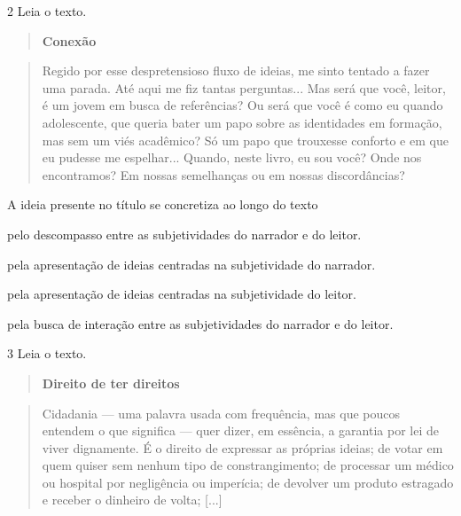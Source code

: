 \num{2} Leia o texto.

\begin{quote}
\centering\textbf{Conexão}
\end{quote}


\begin{quote}
Regido por esse despretensioso fluxo de ideias, me sinto tentado a fazer
uma parada. Até aqui me fiz tantas perguntas... Mas será que você,
leitor, é um jovem em busca de referências? Ou será que você é como eu
quando adolescente, que queria bater um papo sobre as identidades em
formação, mas sem um viés acadêmico? Só um papo que trouxesse conforto e
em que eu pudesse me espelhar... Quando, neste livro, eu sou você? Onde
nos encontramos? Em nossas semelhanças ou em nossas discordâncias?
\end{quote}



A ideia presente no título se concretiza ao longo do texto

\begin{escolha}
\item pelo descompasso entre as subjetividades do narrador e do leitor.

\item pela apresentação de ideias centradas na subjetividade do narrador.

\item pela apresentação de ideias centradas na subjetividade do leitor.

\item pela busca de interação entre as subjetividades do narrador e do
leitor.
\end{escolha}

\num{3} Leia o texto.

\begin{quote}
\centering\textbf{Direito de ter direitos}
\end{quote}


\begin{quote}
Cidadania --- uma palavra usada com frequência, mas que poucos entendem
o que significa --- quer dizer, em essência, a garantia por lei de viver
dignamente. É o direito de expressar as próprias ideias; de votar em
quem quiser sem nenhum tipo de constrangimento; de processar um médico
ou hospital por negligência ou imperícia; de devolver um produto
estragado e receber o dinheiro de volta; {[}...{]}
\end{quote}

